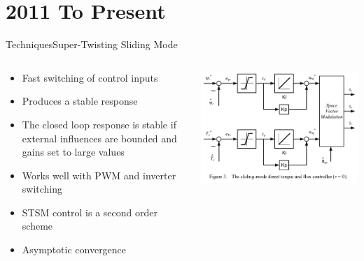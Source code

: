 \documentclass{beamer}
\begin{document}
\section[Techniques]{2011 To Present}
\begin{frame}{Techniques}{Super-Twisting Sliding Mode\cite{6954103}}
\begin{columns}
    \begin{column}{0.47\textwidth}
        \begin{itemize}
	\item Fast switching of control inputs
	\item Produces a stable response
	\item The closed loop response is stable if external influences are bounded and gains set to large values
	\item Works well with PWM and inverter switching
	\item STSM control is a second order scheme
	\item Asymptotic convergence
        \end{itemize}
    \end{column}
    \begin{column}{0.5\textwidth}
        \includegraphics[scale=.25]{./images/direct_torque_flux_controller.png}
    \end{column}
\end{columns}
\end{frame}
\end{document}
